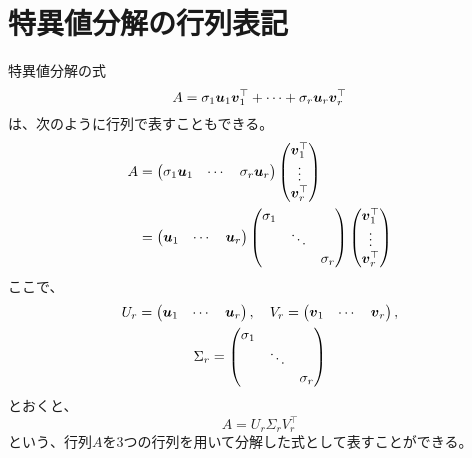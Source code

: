 \documentclass[../../../topic_linear-algebra]{subfiles}
\begin{document}
\sectionline
\section{特異値分解の行列表記}\label{sec:matrix-form-svd}

特異値分解の式
\begin{equation*}
  A = \sigma_1\vb*{u}_1\vb*{v}_1^\top + \cdots + \sigma_r \vb*{u}_r \vb*{v}_r^\top
\end{equation*}
は、次のように行列で表すこともできる。
\begin{align*}
  A & = \begin{pmatrix}
    \sigma_1\vb*{u}_1 & \cdots & \sigma_r\vb*{u}_r
  \end{pmatrix} \begin{pmatrix}
    \vb*{v}_1^\top \\
    \vdots \\
    \vb*{v}_r^\top
  \end{pmatrix} \\
  & = \begin{pmatrix}
    \vb*{u}_1 & \cdots & \vb*{u}_r
  \end{pmatrix} \begin{pmatrix}
                        \sigma_1 &        &           \\
                                  & \ddots &           \\
                                  &        & \sigma_r
                      \end{pmatrix} \begin{pmatrix}
    \vb*{v}_1^\top \\
    \vdots      \\
    \vb*{v}_r^\top
  \end{pmatrix}
\end{align*}
ここで、
\begin{gather*}
  U_r = \begin{pmatrix}
    \vb*{u}_1 & \cdots & \vb*{u}_r
  \end{pmatrix}, \quad
  V_r = \begin{pmatrix}
    \vb*{v}_1 & \cdots & \vb*{v}_r
  \end{pmatrix}, \\
  \Sigma_r = \begin{pmatrix}
                        \sigma_1 &        &           \\
                                  & \ddots &           \\
                                  &        & \sigma_r
                      \end{pmatrix}
\end{gather*}
とおくと、
\begin{equation*}
  A = U_r \Sigma_r V_r^\top
\end{equation*}
という、行列$A$を3つの行列を用いて分解した式として表すことができる。
\end{document}
